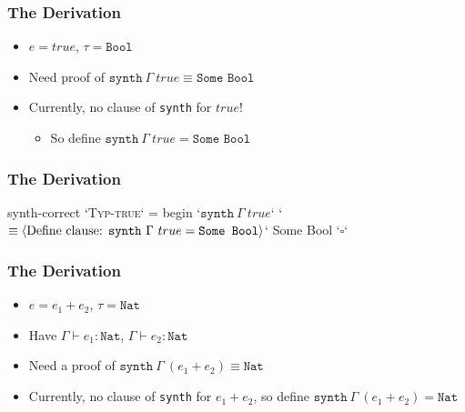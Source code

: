 \documentclass[usenames,dvipsnames]{beamer}
\newcommand{\synth}{\texttt{synth}}
\newcommand{\Nat}{\texttt{Nat}}
\newcommand{\Bool}{\texttt{Bool}}
\begin{document}
{
  \begin{frame}
    \frametitle{The Derivation}

    \begin{itemize}
      \item $e = true$, $\tau = \Bool$
      \item Need proof of $\synth\ \Gamma\ true \equiv \texttt{Some Bool}$
      \item Currently, no clause of \synth{} for $true$!
        \begin{itemize}
          \item So define $\synth\ \Gamma\ true = \texttt{Some Bool}$
        \end{itemize}
    \end{itemize}
  \end{frame}
}


{
  \begin{frame}[fragile]
    \frametitle{The Derivation}

    \begin{code}
      synth-correct `\textsc{Typ-true}` = begin
          `$\synth\ \Gamma\ true$`
        `$\equiv\langle \textnormal{Define clause: }\synth\ \Gamma\ true = \texttt{Some Bool} \rangle$`
          Some Bool
        `$\square$`
    \end{code}
  \end{frame}
}


{
  \begin{frame}
    \frametitle{The Derivation}

    \begin{itemize}
      \item $e = e_1 + e_2$, $\tau = \Nat$
      \item Have $\Gamma \vdash e_1 : \Nat$, $\Gamma \vdash e_2 : \Nat$
      \item Need a proof of $\synth\ \Gamma\ (e_1+e_2) \equiv \Nat$
      \item Currently, no clause of \synth{} for $e_1+e_2$, so define
        $\synth\ \Gamma\ (e_1+e_2) = \Nat$
    \end{itemize}
  \end{frame}
}
\end{document}
